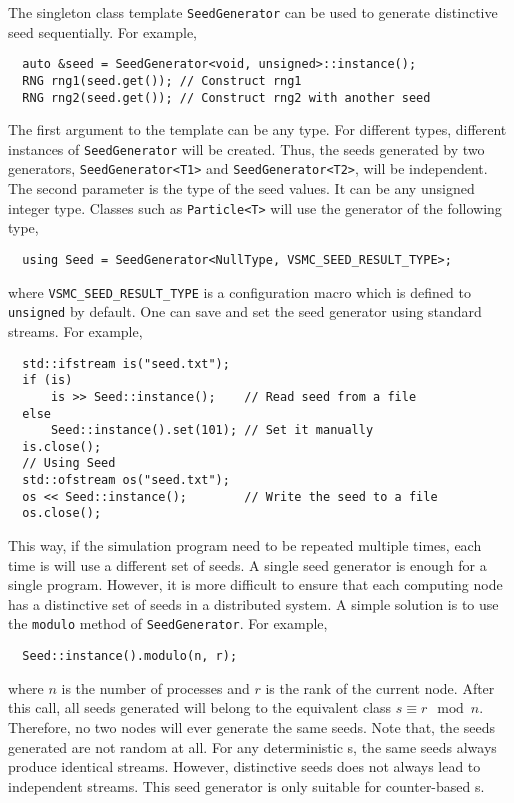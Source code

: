 The singleton class template \verb|SeedGenerator| can be used to generate
distinctive seed sequentially. For example,
\begin{Verbatim}
  auto &seed = SeedGenerator<void, unsigned>::instance();
  RNG rng1(seed.get()); // Construct rng1
  RNG rng2(seed.get()); // Construct rng2 with another seed
\end{Verbatim}
The first argument to the template can be any type. For different types,
different instances of \verb|SeedGenerator| will be created. Thus, the seeds
generated by two generators, \verb|SeedGenerator<T1>| and
\verb|SeedGenerator<T2>|, will be independent. The second parameter is the type
of the seed values. It can be any unsigned integer type. Classes such as
\verb|Particle<T>| will use the generator of the following type,
\begin{Verbatim}
  using Seed = SeedGenerator<NullType, VSMC_SEED_RESULT_TYPE>;
\end{Verbatim}
where \verb|VSMC_SEED_RESULT_TYPE| is a configuration macro which is defined to
\verb|unsigned| by default. One can save and set the seed generator using
standard \cpp streams. For example,
\begin{Verbatim}
  std::ifstream is("seed.txt");
  if (is)
      is >> Seed::instance();    // Read seed from a file
  else
      Seed::instance().set(101); // Set it manually
  is.close();
  // Using Seed
  std::ofstream os("seed.txt");
  os << Seed::instance();        // Write the seed to a file
  os.close();
\end{Verbatim}
This way, if the simulation program need to be repeated multiple times, each
time is will use a different set of seeds. A single seed generator is enough
for a single program. However, it is more difficult to ensure that each
computing node has a distinctive set of seeds in a distributed system. A simple
solution is to use the \verb|modulo| method of \verb|SeedGenerator|. For
example,
\begin{Verbatim}
  Seed::instance().modulo(n, r);
\end{Verbatim}
where $n$ is the number of processes and $r$ is the rank of the current node.
After this call, all seeds generated will belong to the equivalent class $s
\equiv r \mod n$. Therefore, no two nodes will ever generate the same seeds.
Note that, the seeds generated are not random at all. For any deterministic
\rng{}s, the same seeds always produce identical streams. However, distinctive
seeds does not always lead to independent streams. This seed generator is only
suitable for counter-based \rng{}s.


